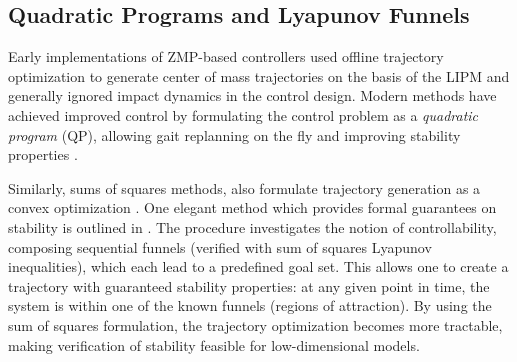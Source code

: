 \subsection{Quadratic Programs and Lyapunov Funnels}


Early implementations of ZMP-based controllers used offline trajectory
optimization to generate center of mass trajectories on the basis of the LIPM
and generally ignored impact dynamics in the control design. Modern methods have
achieved improved control by formulating the control problem as a {\em quadratic
  program} (QP), allowing gait replanning on the fly and improving stability
properties \cite{Kudoh2002, Stephens2010, Herdt2010}.
%

Similarly, sums of squares methods, also formulate trajectory generation as a
convex optimization \cite{Tedrake2010}.
%
One elegant method which provides formal guarantees on stability is outlined in
\cite{Majumdar2013}.
%
The procedure investigates the notion of controllability, composing sequential
funnels (verified with sum of squares Lyapunov inequalities), which each lead to
a predefined goal set.
%
This allows one to create a trajectory with guaranteed stability properties:
%
at any given point in time, the system is within one of the known funnels
(regions of attraction).
%
By using the sum of squares formulation, the trajectory optimization becomes
more tractable, making verification of stability feasible for low-dimensional
models.
